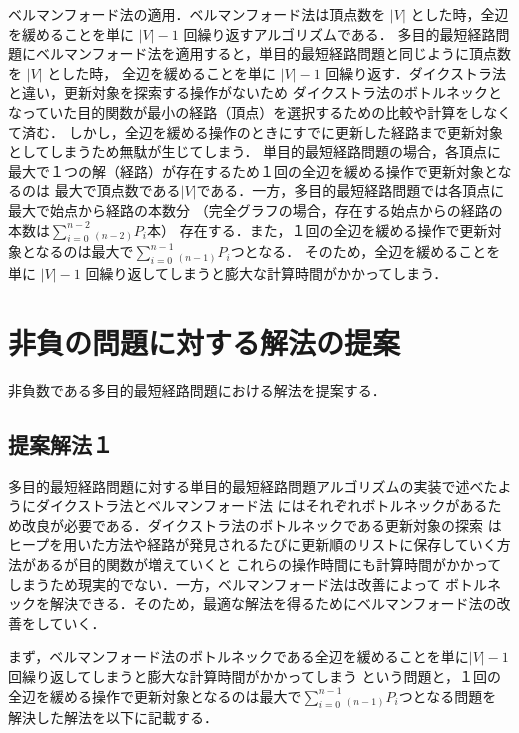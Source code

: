 \documentclass[12pt]{optlab-bachelor}
\begin{document}
ベルマンフォード法の適用．ベルマンフォード法は頂点数を $|V|$ とした時，全辺を緩めることを単に $|V|-1$ 回繰り返すアルゴリズムである．
多目的最短経路問題にベルマンフォード法を適用すると，単目的最短経路問題と同じように頂点数を $|V|$ とした時，
全辺を緩めることを単に $|V|-1$ 回繰り返す．ダイクストラ法と違い，更新対象を探索する操作がないため
ダイクストラ法のボトルネックとなっていた目的関数が最小の経路（頂点）を選択するための比較や計算をしなくて済む．
しかし，全辺を緩める操作のときにすでに更新した経路まで更新対象としてしまうため無駄が生じてしまう．
単目的最短経路問題の場合，各頂点に最大で１つの解（経路）が存在するため１回の全辺を緩める操作で更新対象となるのは
最大で頂点数である$|V|$である．一方，多目的最短経路問題では各頂点に最大で始点から経路の本数分
（完全グラフの場合，存在する始点からの経路の本数は$\displaystyle \sum_{i=0}^{n-2} {}_{(n-2)}P_i$本）
存在する．また，１回の全辺を緩める操作で更新対象となるのは最大で$\displaystyle \sum_{i=0}^{n-1} {}_{(n-1)}P_i$つとなる．
そのため，全辺を緩めることを単に $|V|-1$ 回繰り返してしまうと膨大な計算時間がかかってしまう．

\section{非負の問題に対する解法の提案}
非負数である多目的最短経路問題における解法を提案する．

\subsection{提案解法１}
多目的最短経路問題に対する単目的最短経路問題アルゴリズムの実装で述べたようにダイクストラ法とベルマンフォード法
にはそれぞれボトルネックがあるため改良が必要である．ダイクストラ法のボトルネックである更新対象の探索
はヒープを用いた方法や経路が発見されるたびに更新順のリストに保存していく方法があるが目的関数が増えていくと
これらの操作時間にも計算時間がかかってしまうため現実的でない．一方，ベルマンフォード法は改善によって
ボトルネックを解決できる．そのため，最適な解法を得るためにベルマンフォード法の改善をしていく．

まず，ベルマンフォード法のボトルネックである全辺を緩めることを単に$|V|-1$ 回繰り返してしまうと膨大な計算時間がかかってしまう
という問題と，１回の全辺を緩める操作で更新対象となるのは最大で$\displaystyle \sum_{i=0}^{n-1} {}_{(n-1)}P_i$つとなる問題を
解決した解法を以下に記載する．
\end{document}
